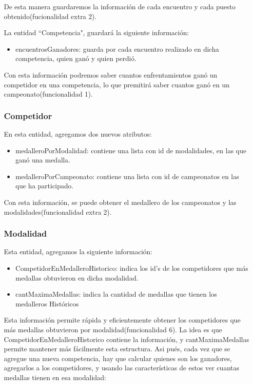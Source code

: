 De esta manera guardaremos la información de cada encuentro y cada puesto obtenido(fucionalidad extra 2).

La entidad ``Competencia", guardará la siguiente información:

\begin{itemize}
	\item encuentrosGanadores: guarda por cada encuentro realizado en dicha competencia, quien ganó y quien perdió.
\end{itemize}

Con esta información podremos saber cuantos enfrentamientos ganó un competidor en una competencia, lo que premitirá saber cuantos ganó en un campeonato(funcionalidad 1).

\subsubsection{Competidor}

En esta entidad, agregamos dos nuevos atributos:
\begin{itemize}
	\item medalleroPorModalidad: contiene una lista con id de modalidades, en las que ganó una medalla.
	\item medalleroPorCampeonato: contiene una lista con id de campeonatos en las que ha participado.
\end{itemize}

Con esta información, se puede obtener el medallero de los campeonatos y las modalidades(funcionalidad extra 2).

\subsubsection{Modalidad}

Esta entidad, agregamos la siguiente información:

\begin{itemize}
	\item CompetidorEnMedalleroHistorico: indica los id's de los competidores que más medallas obtuvieron en dicha modalidad.
	\item cantMaximaMedallas: indica la cantidad de medallas que tienen los medalleros Históricos
\end{itemize}

Esta información permite rápida y eficientemente obtener los competidores que más medallas obtuvieron por modalidad(funcionalidad 6). La idea es que CompetidorEnMedalleroHistorico contiene la información, y cantMaximaMedallas permite mantener más fácilmente esta estructura. Asi pués, cada vez que se agregue una nueva competencia, hay que calcular quienes son los ganadores, agregarlos a los competidores, y usando las características de estos ver cuantas medallas tienen en esa modalidad:

